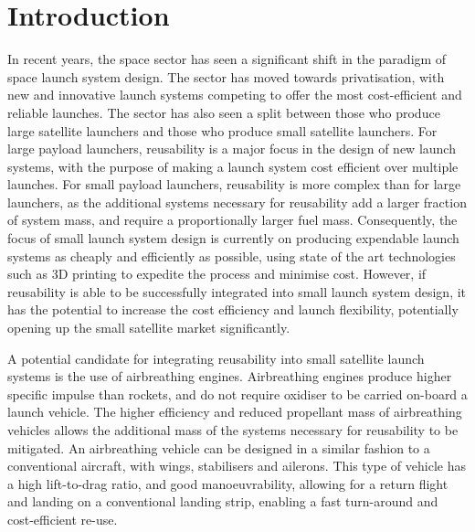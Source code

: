 
\cleardoublepage
\chapter{Introduction}


  

  		
  	In recent years, the space sector has seen a significant shift in the paradigm of space launch system design. 
  	The sector has moved towards privatisation, with new and innovative launch systems competing to offer the most cost-efficient and reliable launches. 
  	The sector has also seen a split between those who produce large satellite launchers and those who produce small satellite launchers.
  	For large payload launchers, reusability is a major focus in the design of new launch systems, with the purpose of making a launch system cost efficient over multiple launches\cite{Faa2018}. 
  	For small payload launchers, reusability is more complex than for large launchers, as the additional systems necessary for reusability add a larger fraction of system mass, and require a proportionally larger fuel mass. 
  	Consequently, the focus of small launch system design is currently on producing expendable launch systems as cheaply and efficiently as possible, using state of the art technologies such as 3D printing to expedite the process and minimise cost\cite{Niederstrasser2015}.
  	However, if reusability is able to be successfully integrated into small launch system design, it has the potential to increase the cost efficiency and launch flexibility, potentially opening up the small satellite market significantly. 
  	
  	
  	
  	A potential candidate for integrating reusability into small satellite launch systems is the use of airbreathing engines\cite{Smart2009a,Ketsdever2010}.
Airbreathing engines produce higher specific impulse than rockets, and do not require oxidiser to be carried on-board a launch vehicle\cite{Smart2010}.  	 
  	The higher efficiency and reduced propellant mass of airbreathing vehicles allows the additional mass of the systems necessary for reusability to be mitigated\cite{Curran2003}. An airbreathing vehicle can be designed in a similar fashion to a conventional aircraft, with wings, stabilisers and ailerons\cite{Shaughnessy1990,Preller2017b}. This type of vehicle has a high lift-to-drag ratio, and good manoeuvrability, allowing for a return flight and landing on a conventional landing strip\cite{Preller2017b}, enabling a fast turn-around and cost-efficient re-use. 
  	
